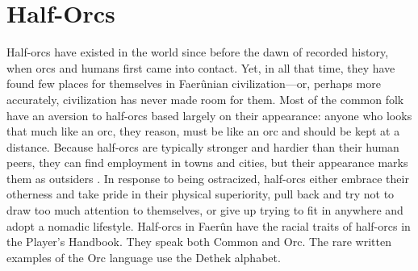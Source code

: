 \documentclass[10pt,a4paper,twoside,twocolumn,openany,bg=print,nodeprecatedcode]{dndbook}
\begin{document}
\section{Half-Orcs}
Half-orcs have existed in the world since before the dawn of recorded history, when orcs and humans first came into contact. Yet, in all that time, they have found few places for themselves in Faerûnian civilization—or, perhaps more accurately, civilization has never made room for them.
Most of the common folk have an aversion to half-orcs based largely on their appearance: anyone who looks that much like an orc, they reason, must be like an orc and should be kept at a distance. Because half-orcs are typically stronger and hardier than their human peers, they can find employment in towns and cities, but their appearance marks them as outsiders . In response to being ostracized, half-orcs either embrace their otherness and take pride in their physical superiority, pull back and try not to draw too much attention to themselves, or give up trying to fit in anywhere and adopt a nomadic lifestyle.
Half-orcs in Faerûn have the racial traits of half-orcs in the Player's Handbook. They speak both Common and Orc. The rare written examples of the Orc language use the Dethek alphabet.
\end{document}
